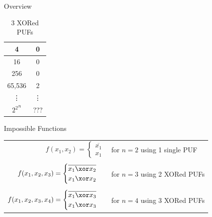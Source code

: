 \documentclass[10pt, compress]{beamer}
\begin{document}
\begin{frame}{Overview}
\begin{table}[H]
\begin{subtable}{0.23\textwidth}
\begin{tabular}{|c|c|}
            4         & 0         \\ \hline
            16        & 0         \\ \hline
            256       & 0         \\ \hline
            65,536    & 2         \\ \hline
            \vdots    & \vdots    \\ \hline
            ${2^2}^n$ & ???       \\ \hline
            \end{tabular}
            \caption{3 XORed PUFs}
        \end{subtable}
    \end{table}
\end{frame}

\begin{frame}{Impossible Functions}
    \begin{table}[H]
        \centering
        \begin{tabular}{r l}
             $f(x_1,x_2) =  \begin{cases} 
                                    \overline{x_1}\\ 
                                    x_1
                                \end{cases}$ &  for $n=2$ using 1 single PUF \\
                                &\\
             $f(x_1,x_2,x_3) =  \begin{cases} 
                                    \overline{x_1 \xor x_2}\\ 
                                    x_1 \xor x_2
                                \end{cases}$ & for $n = 3$ using 2 XORed PUFs \\
                                &\\
             $f(x_1,x_2,x_3,x_4) =  \begin{cases} 
                                    \overline{x_1 \xor x_3}\\ 
                                    x_1 \xor x_3
                                \end{cases}$ & for $n = 4$ using 3 XORed PUFs
                                
        \end{tabular}
    \end{table}  
\end{frame}
\end{document}
